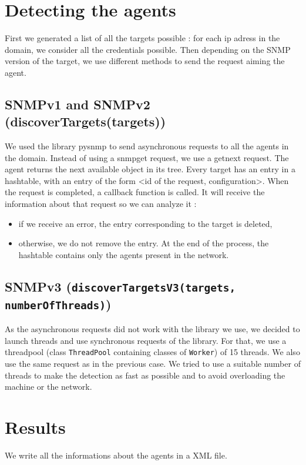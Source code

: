 \documentclass[a4paper,titlepage]{article}
\begin{document}
\section{Detecting the agents}
First we generated a list of all the targets possible : for each ip adress in the domain, we consider all the credentials possible.  Then depending on the SNMP version of the target, we use different methods to send the request aiming the agent. 
	
	\subsection{SNMPv1 and SNMPv2 (discoverTargets(targets))}
	We used the library pysnmp to send asynchronous requests to all the agents in the domain. Instead of using a snmpget request, we use a getnext request. The agent returns the next available object in its tree. Every target has an entry in a hashtable, with an entry of the form <id of the request, configuration>. When the request is completed, a callback function is called. It will receive the information about that request so we can analyze it :
	\begin{itemize}
	 	\item if we receive an error, the entry corresponding to the target is deleted,
	 	\item otherwise, we do not remove the entry. At the end of the process, the hashtable contains only the agents present in the network.
	 \end{itemize}  


	\subsection{SNMPv3 (\texttt{discoverTargetsV3(targets, numberOfThreads)})}
	As the asynchronous requests did not work with the library we use, we decided to launch threads and use synchronous requests of the library. 
	For that, we use a threadpool (class \texttt{ThreadPool} containing classes of \texttt{Worker}) of 15 threads. We also use the same request as in the previous case. We tried to use a suitable number of threads to make the detection as fast as possible and to avoid overloading the machine or the network.


\section{Results}
We write all the informations about the agents in a XML file.
\end{document}
